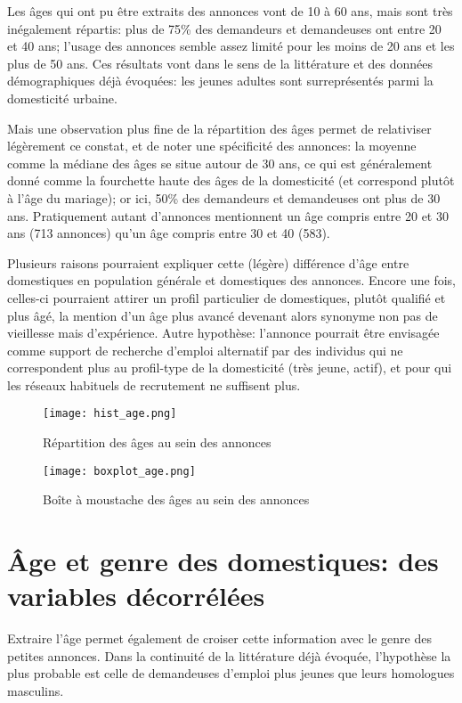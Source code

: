 Les âges qui ont pu être extraits des annonces vont de 10 à 60 ans, mais sont très inégalement répartis: plus de 75\% des demandeurs et demandeuses ont entre 20 et 40 ans; l'usage des annonces semble assez limité pour les moins de 20 ans et les plus de 50 ans. Ces résultats vont dans le sens de la littérature et des données démographiques déjà évoquées: les jeunes adultes sont surreprésentés parmi la domesticité urbaine. 

Mais une observation plus fine de la répartition des âges permet de relativiser légèrement ce constat, et de noter une spécificité des annonces: la moyenne comme la médiane des âges se situe autour de 30 ans, ce qui est généralement donné comme la fourchette haute des âges de la domesticité (et correspond plutôt à l'âge du mariage); or ici, 50\% des demandeurs et demandeuses ont plus de 30 ans. Pratiquement autant d'annonces mentionnent un âge compris entre 20 et 30 ans (713 annonces) qu'un âge compris entre 30 et 40 (583). 

Plusieurs raisons pourraient expliquer cette (légère) différence d'âge entre domestiques en population générale et domestiques des annonces. Encore une fois, celles-ci pourraient attirer un profil particulier de domestiques, plutôt qualifié et plus âgé, la mention d'un âge plus avancé devenant alors synonyme non pas de vieillesse mais d'expérience. Autre hypothèse: l'annonce pourrait être envisagée comme support de recherche d'emploi alternatif par des individus qui ne correspondent plus au profil-type de la domesticité (très jeune, actif), et pour qui les réseaux habituels de recrutement ne suffisent plus. 


\begin{figure}[ht]
	\centering
	\texttt{[image: hist\_age.png]}
	\caption{Répartition des âges au sein des annonces}
\end{figure}

\begin{figure}[ht]
	\centering
	\texttt{[image: boxplot\_age.png]}
	\caption{Boîte à moustache des âges au sein des annonces}
\end{figure}



\section{Âge et genre des domestiques: des variables décorrélées}


Extraire l'âge  permet également de croiser cette information avec le genre des petites annonces. Dans la continuité de la littérature déjà évoquée, l'hypothèse la plus probable est celle de demandeuses d'emploi plus jeunes que leurs homologues masculins. 

